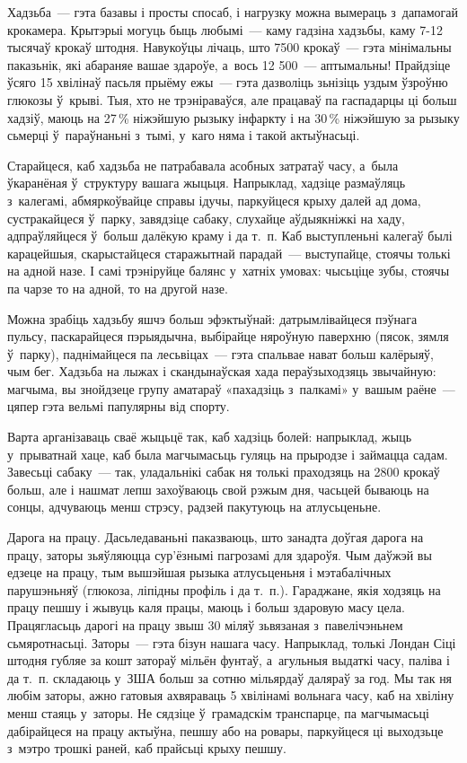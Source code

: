 Хадзьба~--- гэта базавы і просты спосаб, і нагрузку можна вымераць з~дапамогай крокамера. Крытэрыі могуць быць любымі~--- каму гадзіна хадзьбы, каму 7-12 тысячаў крокаў штодня. Навукоўцы лічаць, што 7500 крокаў~--- гэта мінімальны паказьнік, які абараняе вашае здароўе, а~вось 12 500~--- аптымальны! Прайдзіце ўсяго 15 хвілінаў пасьля прыёму ежы~--- гэта дазволіць зьнізіць уздым ўзроўню глюкозы ў~крыві. Тыя, хто не трэніраваўся, але працаваў па гаспадарцы ці больш хадзіў, маюць на 27\,\% ніжэйшую рызыку інфаркту і на 30\,\% ніжэйшую за рызыку сьмерці ў~параўнаньні з~тымі, у~каго няма і такой актыўнасьці.

Старайцеся, каб хадзьба не патрабавала асобных затратаў часу, а~была ўкаранёная ў~структуру вашага жыцьця. Напрыклад, хадзіце размаўляць з~калегамі, абмяркоўвайце справы ідучы, паркуйцеся крыху далей ад дома, сустракайцеся ў~парку, завядзіце сабаку, слухайце аўдыякніжкі на хаду, адпраўляйцеся ў~больш далёкую краму і да т.~п. Каб выступленьні калегаў былі карацейшыя, скарыстайцеся старажытнай парадай~--- выступайце, стоячы толькі на адной назе. І самі трэніруйце балянс у~хатніх умовах: чысьціце зубы, стоячы па чарзе то на адной, то на другой назе.

Можна зрабіць хадзьбу яшчэ больш эфэктыўнай: датрымлівайцеся пэўнага пульсу, паскарайцеся пэрыядычна, выбірайце няроўную паверхню (пясок, зямля ў~парку), паднімайцеся па лесьвіцах~--- гэта спальвае нават больш калёрыяў, чым бег. Хадзьба на лыжах і скандынаўская хада пераўзыходзяць звычайную: магчыма, вы знойдзеце групу аматараў «пахадзіць з~палкамі» у~вашым раёне~--- цяпер гэта вельмі папулярны від спорту.

Варта арганізаваць сваё жыцьцё так, каб хадзіць болей: напрыклад, жыць у~прыватнай хаце, каб была магчымасьць гуляць на прыродзе і займацца садам. Завесьці сабаку~--- так, уладальнікі сабак ня толькі праходзяць на 2800 крокаў больш, але і нашмат лепш захоўваюць свой рэжым дня, часьцей бываюць на сонцы, адчуваюць менш стрэсу, радзей пакутуюць на атлусьценьне.

Дарога на працу. Дасьледаваньні паказваюць, што занадта доўгая дарога на працу, заторы зьяўляюцца сур'ёзнымі пагрозамі для здароўя. Чым даўжэй вы едзеце на працу, тым вышэйшая рызыка атлусьценьня і мэтабалічных парушэньняў (глюкоза, ліпідны профіль і да т.~п.). Гараджане, якія ходзяць на працу пешшу і жывуць каля працы, маюць і больш здаровую масу цела. Працягласьць дарогі на працу звыш 30 міляў зьвязаная з~павелічэньнем сьмяротнасьці. Заторы~--- гэта бізун нашага часу. Напрыклад, толькі Лондан Сіці штодня губляе за кошт затораў мільён фунтаў, а~агульныя выдаткі часу, паліва і да т.~п. складаюць у~ЗША больш за сотню мільярдаў даляраў за год. Мы так ня любім заторы, ажно гатовыя ахвяраваць 5 хвілінамі вольнага часу, каб на хвіліну менш стаяць у~заторы. Не сядзіце ў~грамадскім транспарце, па магчымасьці дабірайцеся на працу актыўна, пешшу або на ровары, паркуйцеся ці выходзьце з~мэтро трошкі раней, каб прайсьці крыху пешшу.

